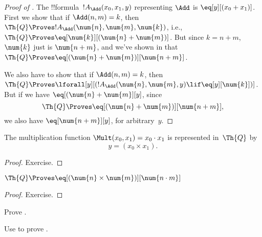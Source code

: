 \documentclass[../../../include/open-logic-section]{subfiles}
\begin{document}
\begin{proof}[Proof of ]
The !!{formula}~$!A_\Add(x_0, x_1, y)$ representing $\Add$ is
$\eq[y][(x_0 + x_1)]$. First we show that if $\Add(n, m) = k$, then
$\Th{Q} \Proves !A_\Add(\num{n}, \num{m}, \num{k})$, i.e., $\Th{Q}
\Proves \eq[\num{k}][(\num{n} + \num{m})]$. But since $k = n + m$,
$\num{k}$ just is $\num{n+m}$, and we've shown in
 that $\Th{Q} \Proves \eq[(\num{n} +
  \num{m})][\num{n+m}]$.

We also have to show that if $\Add(n, m) = k$, then $\Th{Q} \Proves
\lforall[y][(!A_\Add(\num{n}, \num{m}, y) \lif \eq[y][\num{k}])]$.
But if we have $\eq[(\num{n} + \num{m}][y]$, since
\[
\Th{Q} \Proves \eq[(\num{n}+\num{m})][\num{n+m}],
\]
we also have $\eq[\num{n+m}][y]$, for arbitrary~$y$.
\end{proof}

\begin{prop}
The multiplication function $\Mult(x_0, x_1) = x_0 \cdot x_1$ is represented
in~$\Th{Q}$ by
\[
y = (x_0 \times x_1).
\]
\end{prop}

\begin{proof} Exercise. \end{proof}

\begin{lem}
$\Th{Q} \Proves \eq[(\num{n} \times \num{m})][\num{n \cdot m}]$
\end{lem}

\begin{proof} Exercise. \end{proof}

\begin{prob}
Prove .
\end{prob}

\begin{prob}
Use  to prove
.
\end{prob}
\end{document}
